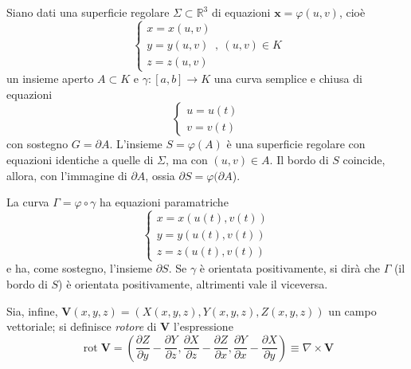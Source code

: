 \documentclass[10pt, a4paper]{scrartcl}
\theoremstyle{definition}
\numberwithin{esempio}{section}
\theoremstyle{definition}
\numberwithin{obs}{section}
\numberwithin{nota}{section}
\numberwithin{equation}{subsection}
\begin{document}
Siano dati una superficie regolare $\Sigma \subset \mathbb{R}^3$ di equazioni $\mathbf{x}  = \varphi (u,v)$, cio\`e
\[
\begin{cases}
	x = x (u,v) \\
	y= y (u,v) \\
	z=  z(u,v)
\end{cases} , \ (u,v) \in K
\] 
un insieme aperto $A\subset K$ e $\gamma : \left[ a,b \right] \to K$ una curva semplice e chiusa di equazioni
\[
\begin{cases}
	u = u(t) \\ 
	v = v(t)
\end{cases}
\] 
con sostegno $G = \partial A$.
L'insieme $S = \varphi (A)$ \`e una superficie regolare con equazioni identiche a quelle di $\Sigma$, ma con $(u,v) \in A$.
Il bordo di $S$ coincide, allora, con l'immagine di $\partial A$, ossia $\partial S = \varphi (\partial A$).

La curva $\Gamma = \varphi  \circ \gamma$ ha equazioni paramatriche
\[
\begin{cases}
	x = x(u(t), v(t))\\
	y = y (u(t) , v(t))\\
	z = z(u(t), v(t)) 
\end{cases}
\] 
e ha, come sostegno, l'insieme $\partial S$.
Se $\gamma$ \`e orientata positivamente, si dir\`a che $\Gamma$ (il bordo di $S$) \`e orientata positivamente, altrimenti vale il viceversa.

Sia, infine, $\mathbf{V} (x,y,z) = (X (x,y,z) , Y(x,y,z) , Z(x,y,z))$ un campo vettoriale; si definisce \textit{rotore} di $\mathbf{V} $ l'espressione
\begin{equation}
\operatorname{rot} \mathbf{V}   = \left(\frac{\partial Z}{\partial y} - \frac{\partial Y}{\partial z} , \frac{\partial X}{\partial z} - \frac{\partial Z}{\partial x} , \frac{\partial Y}{\partial x} - \frac{\partial X}{\partial y} \right) \equiv \nabla \times \mathbf{V} 
\end{equation}
\end{document}
